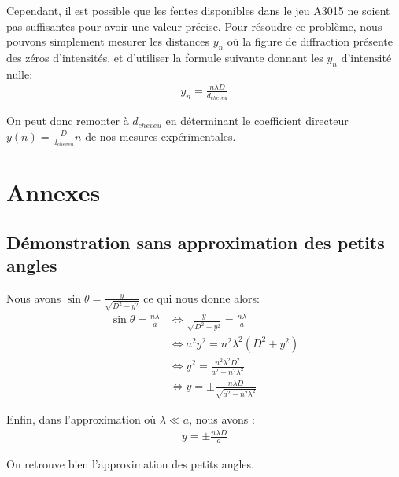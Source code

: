 \documentclass[12pt]{article}
\begin{document}
Cependant, il est possible que les fentes disponibles dans le jeu A3015 ne soient pas suffisantes pour avoir une valeur précise. Pour résoudre ce problème, nous pouvons
simplement mesurer les distances $y_n$ où la figure de diffraction présente des zéros d'intensités, et d'utiliser la formule suivante donnant les $y_n$ d'intensité nulle:
\begin{align}
    y_n = \frac{n\lambda D}{d_{cheveu}}
\end{align}

On peut donc remonter à $d_{cheveu}$ en déterminant le coefficient directeur $y(n) = \frac{D}{d_{cheveu}} n$ de nos mesures expérimentales.



\newpage

\section*{Annexes}
\subsection{Démonstration sans approximation des petits angles}
Nous avons $\sin \theta = \frac{y}{\sqrt{D^2+y^2}}$ ce qui nous donne alors:
\begin{align*}
    \sin \theta = \frac{n\lambda}{a} & \Leftrightarrow \frac{y}{\sqrt{D^2+y^2}} = \frac{n\lambda}{a} \\
    & \Leftrightarrow a^2y^2 = n^2 \lambda ^2 \left( D^2 + y^2 \right) \\
    & \Leftrightarrow y^2 = \frac{n^2 \lambda^2 D^2}{a^2 - n^2 \lambda^2} \\
    & \Leftrightarrow y = \pm \frac{n \lambda D}{\sqrt{a^2 - n^2 \lambda^2}}
\end{align*}

Enfin, dans l'approximation où $\lambda \ll a$, nous avons :
\begin{align}
    y = \pm \frac{n \lambda D}{a}
\end{align}

On retrouve bien l'approximation des petits angles.
\end{document}
